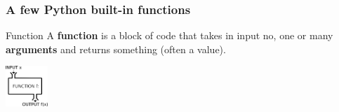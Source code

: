 \documentclass[xcolor=dvipsnames]{beamer}
\begin{document}
\begin{frame}
\frametitle{A few Python built-in functions}

\begin{block}{Function}
A \textbf{function} is a block of code that takes in input no, one or many \textbf{arguments}
and returns something (often a value).
\end{block}

\begin{minipage}[tl]{0.45\textwidth}
\includegraphics[width=60px]{images/Function_machine2.png}
\end{minipage}

\begin{minipage}[tr]{0.45\textwidth}

\end{minipage}
\end{frame}
\end{document}
